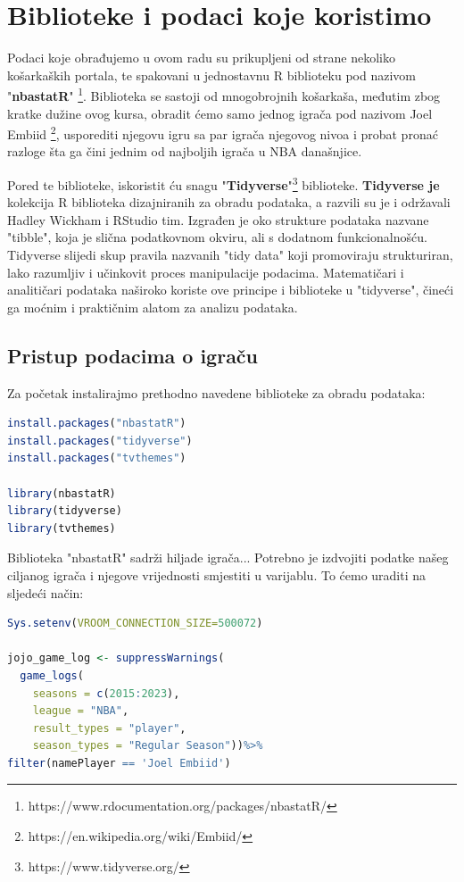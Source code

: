 \documentclass[letterpaper,11pt,leqno]{article}
\begin{document}
\section{Biblioteke i podaci koje koristimo}\label{s:section}

Podaci koje obrađujemo u ovom radu su prikupljeni od strane nekoliko košarkaških portala, te spakovani u jednostavnu R biblioteku pod nazivom "\textbf{nbastatR}" \footnote{https://www.rdocumentation.org/packages/nbastatR/}.
Biblioteka se sastoji od mnogobrojnih košarkaša, međutim zbog kratke dužine ovog kursa, obradit ćemo samo jednog igrača pod nazivom Joel Embiid \footnote{https://en.wikipedia.org/wiki/Embiid/}, usporediti njegovu igru sa par igrača njegovog nivoa i probat pronać razloge šta ga čini jednim od najboljih igrača u NBA današnjice.

Pored te biblioteke, iskoristit ću snagu "\textbf{Tidyverse}"\footnote{https://www.tidyverse.org/}
biblioteke. \textbf{Tidyverse je} kolekcija R biblioteka dizajniranih za obradu podataka, a razvili su je i održavali Hadley Wickham i RStudio tim. Izgrađen je oko strukture podataka nazvane "tibble", koja je slična podatkovnom okviru, ali s dodatnom funkcionalnošću. Tidyverse slijedi skup pravila nazvanih "tidy data" koji promoviraju strukturiran, lako razumljiv i učinkovit proces manipulacije podacima. Matematičari i analitičari podataka naširoko koriste ove principe i biblioteke u "tidyverse", čineći ga moćnim i praktičnim alatom za analizu podataka.

\newpage

\subsection{Pristup podacima o igraču}

Za početak instalirajmo prethodno navedene biblioteke za obradu podataka:

\begin{lstlisting}[language=R]
install.packages("nbastatR")
install.packages("tidyverse")
install.packages("tvthemes")

library(nbastatR)
library(tidyverse)
library(tvthemes)
\end{lstlisting}

Biblioteka "nbastatR" sadrži hiljade igrača... Potrebno je izdvojiti podatke našeg ciljanog igrača i njegove vrijednosti smjestiti u varijablu. To ćemo uraditi na sljedeći način:

\begin{lstlisting}[language=R]
Sys.setenv(VROOM_CONNECTION_SIZE=500072)

jojo_game_log <- suppressWarnings(
  game_logs( 
    seasons = c(2015:2023),
    league = "NBA", 
    result_types = "player",
    season_types = "Regular Season"))%>% 
filter(namePlayer == 'Joel Embiid')
\end{lstlisting}
\end{document}
